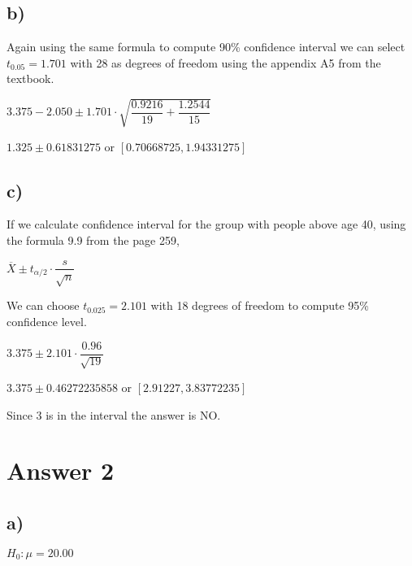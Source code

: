 \documentclass[12pt]{article}
\begin{document}
\subsection*{b)}
    Again using the same formula to compute 90\% confidence interval we can select $t_{0.05} = 1.701$ with 28 as degrees of freedom using the appendix A5 from the textbook.
    
    \begin{center}
        $3.375 - 2.050 \pm 1.701 \cdot \sqrt{\dfrac{0.9216}{19} + \dfrac{1.2544}{15}}$
    \end{center}
    
    \begin{center}
        $1.325 \pm 0.61831275$ or $[0.70668725, 1.94331275]$
    \end{center}
    

\subsection*{c)}
    If we calculate confidence interval for the group with people above age 40, using the formula 9.9 from the page 259,
    
    \begin{center}
        $\overline{X} \pm t_{\alpha / 2} \cdot \dfrac{s}{\sqrt{n}}$
    \end{center}
    
    We can choose $t_{0.025} = 2.101$ with 18 degrees of freedom to compute 95\% confidence level.
    
    \begin{center}
        $3.375 \pm 2.101 \cdot \dfrac{0.96}{\sqrt{19}}$
    \end{center}
    
    \begin{center}
        $3.375 \pm 0.46272235858$ or $[2.91227, 3.83772235]$
    \end{center}
    
    Since $3$ is in the interval the answer is NO.

\section*{Answer 2}

\subsection*{a)}
    \begin{center}
        $H_0: \mu = 20.00$
    \end{center}
\end{document}
